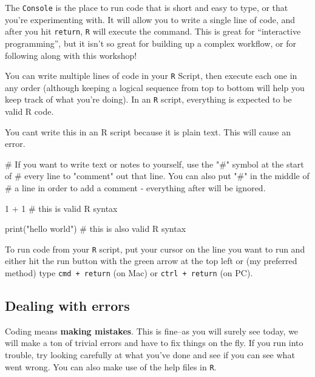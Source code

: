 \documentclass[
]{book}
\newenvironment{Shaded}{\begin{snugshade}}{\end{snugshade}}
\newcommand{\NormalTok}[1]{#1}
\newcommand{\StringTok}[1]{\textcolor[rgb]{0.31,0.60,0.02}{#1}}
\begin{document}
The \texttt{Console} is the place to run code that is short and easy to type, or that you're experimenting with. It will allow you to write a single line of code, and after you hit \texttt{return}, \texttt{R} will execute the command. This is great for ``interactive programming'', but it isn't so great for building up a complex workflow, or for following along with this workshop!

You can write multiple lines of code in your \texttt{R} Script, then execute each one in any order (although keeping a logical sequence from top to bottom will help you keep track of what you're doing). In an \texttt{R} script, everything is expected to be valid R code.

\begin{Shaded}
\begin{Highlighting}[]
\NormalTok{You can}\StringTok{\textquotesingle{}t write this in an R script because it is plain text.  This will}
\StringTok{cause an error.}

\StringTok{\# If you want to write text or notes to yourself, use the "\#" symbol at the start of }
\StringTok{\# every line to "comment" out that line.  You can also put "\#" in the middle of}
\StringTok{\# a line in order to add a comment {-} everything after will be ignored.}

\StringTok{1 + 1 \# this is valid R syntax}

\StringTok{print("hello world") \# this is also valid R syntax}
\end{Highlighting}
\end{Shaded}

To run code from your \texttt{R} script, put your cursor on the line you want to run and either hit the run button with the green arrow at the top left or (my preferred method) type \texttt{cmd\ +\ return} (on Mac) or \texttt{ctrl\ +\ return} (on PC).

\hypertarget{dealing-with-errors}{%
\subsection*{Dealing with errors}\label{dealing-with-errors}}

Coding means \textbf{making mistakes}. This is fine--as you will surely see today, we will make a ton of trivial errors and have to fix things on the fly. If you run into trouble, try looking carefully at what you've done and see if you can see what went wrong. You can also make use of the help files in \texttt{R}.
\end{document}
